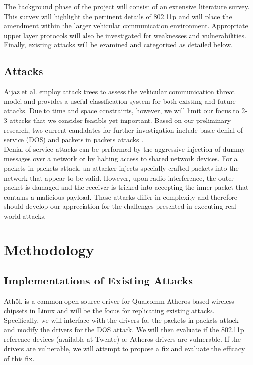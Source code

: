 \documentclass[conference]{IEEEtran}
\begin{document}
The background phase of the project will consist of an extensive literature survey. This survey will highlight the pertinent details of 802.11p and will place the amendment within the larger vehicular communication environment. Appropriate upper layer protocols will also be investigated for weaknesses and vulnerabilities. Finally, existing attacks will be examined and categorized as detailed below. 

\subsection{Attacks}
Aijaz et al. \cite{aijaz2006attacks} employ attack trees to assess the vehicular communication threat model and provides a useful classification system for both existing and future attacks. Due to time and space constraints, however, we will limit our focus to 2-3 attacks that we consider feasible yet important. Based on our preliminary research, two current candidates for further investigation include basic denial of service (DOS) and packets in packets attacks \cite{goodspeed2011packets}. \\

Denial of service attacks can be performed by the aggressive injection of dummy messages over a network or by halting access to shared network devices. For a packets in packets attack, an attacker injects specially crafted packets into the network that appear to be valid. However, upon radio interference, the outer packet is damaged and the receiver is tricked into accepting the inner packet that contains a malicious payload. These attacks differ in complexity and therefore should develop our appreciation for the challenges presented in executing real-world attacks.\\

\section{Methodology}
\subsection{ Implementations of Existing Attacks}
\label{sec:existing_attacks}
Ath5k is a common open source driver for Qualcomm Atheros based wireless chipsets in Linux and will be the focus for replicating existing attacks. Specifically, we will interface with the drivers for the packets in packets attack and modify the drivers for the DOS attack. We will then evaluate if the 802.11p reference devices (available at Twente) or Atheros drivers are vulnerable. If the drivers are vulnerable, we will attempt to propose a fix and evaluate the efficacy of this fix.\\
\end{document}
